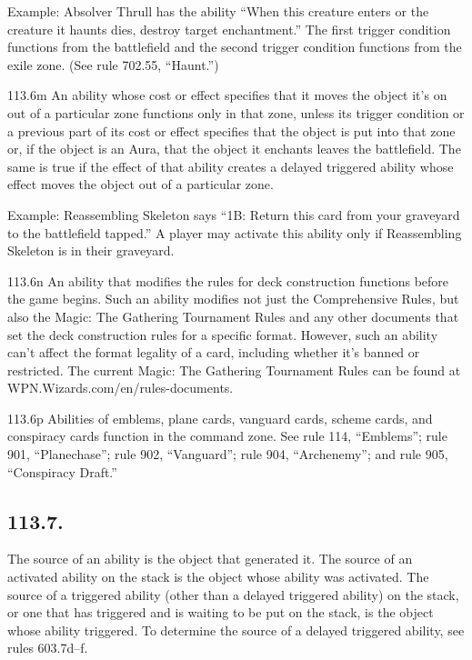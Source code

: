 Example: Absolver Thrull has the ability “When this creature enters or the creature it haunts dies, destroy target enchantment.” The first trigger condition functions from the battlefield and the second trigger condition functions from the exile zone. (See rule 702.55, “Haunt.”)

113.6m An ability whose cost or effect specifies that it moves the object it’s on out of a particular zone functions only in that zone, unless its trigger condition or a previous part of its cost or effect specifies that the object is put into that zone or, if the object is an Aura, that the object it enchants leaves the battlefield. The same is true if the effect of that ability creates a delayed triggered ability whose effect moves the object out of a particular zone.

Example: Reassembling Skeleton says “{1}{B}: Return this card from your graveyard to the battlefield tapped.” A player may activate this ability only if Reassembling Skeleton is in their graveyard.

113.6n An ability that modifies the rules for deck construction functions before the game begins. Such an ability modifies not just the Comprehensive Rules, but also the Magic: The Gathering Tournament Rules and any other documents that set the deck construction rules for a specific format. However, such an ability can’t affect the format legality of a card, including whether it’s banned or restricted. The current Magic: The Gathering Tournament Rules can be found at WPN.Wizards.com/en/rules-documents.

113.6p Abilities of emblems, plane cards, vanguard cards, scheme cards, and conspiracy cards function in the command zone. See rule 114, “Emblems”; rule 901, “Planechase”; rule 902, “Vanguard”; rule 904, “Archenemy”; and rule 905, “Conspiracy Draft.”

\subsection*{113.7.}
The source of an ability is the object that generated it. The source of an activated ability on the stack is the object whose ability was activated. The source of a triggered ability (other than a delayed triggered ability) on the stack, or one that has triggered and is waiting to be put on the stack, is the object whose ability triggered. To determine the source of a delayed triggered ability, see rules 603.7d–f.


